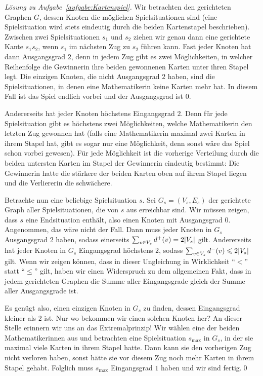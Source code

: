\begin{proof}[Lösung zu Aufgabe~\ref{aufgabe:Kartenspiel}]
	Wir betrachten den gerichteten Graphen $G$, dessen Knoten die möglichen Spielsituationen sind (eine Spielsituation wird stets eindeutig durch die beiden Kartenstapel beschrieben). Zwischen zwei Spielsituationen $s_1$ und $s_2$ ziehen wir genau dann eine gerichtete Kante $s_1s_2$, wenn $s_1$ im nächsten Zug zu $s_2$ führen kann. Fast jeder Knoten hat dann Ausgangsgrad $2$, denn in jedem Zug gibt es zwei Möglichkeiten, in welcher Reihenfolge die Gewinnerin ihre beiden gewonnenen Karten unter ihren Stapel legt. Die einzigen Knoten, die nicht Ausgangsgrad $2$ haben, sind die Spielsituationen, in denen eine Mathematikerin keine Karten mehr hat. In diesem Fall ist das Spiel endlich vorbei und der Ausgangsgrad ist $0$.
	
	Andererseits hat jeder Knoten höchstens Eingangsgrad $2$. Denn für jede Spielsituation gibt es höchstens zwei Möglichkeiten, welche Mathematikerin den letzten Zug gewonnen hat (falls eine Mathematikerin maximal zwei Karten in ihrem Stapel hat, gibt es sogar nur eine Möglichkeit, denn sonst wäre das Spiel schon vorbei gewesen). Für jede Möglichkeit ist die vorherige Verteilung durch die beiden untersten Karten im Stapel der Gewinnerin eindeutig bestimmt: Die Gewinnerin hatte die stärkere der beiden Karten oben auf ihrem Stapel liegen und die Verliererin die schwächere.
	
	Betrachte nun eine beliebige Spielsituation $s$. Sei $G_s=(V_s,E_s)$ der gerichtete Graph aller Spielsituationen, die von $s$ aus erreichbar sind. Wir müssen zeigen, dass $s$ eine Endsituation enthält, also einen Knoten mit Ausgangsgrad $0$. Angenommen, das wäre nicht der Fall. Dann muss jeder Knoten in $G_s$ Ausgangsgrad $2$ haben, sodass einerseits $\sum_{v\in V_s}d^+(v)=2\lvert V_s\rvert$ gilt. Andererseits hat jeder Knoten in $G_s$ Eingangsgrad höchstens $2$, sodass $\sum_{v\in V_s}d^-(v)\leqslant 2\lvert V_s\rvert$ gilt. Wenn wir zeigen können, dass in dieser Ungleichung in Wirklichkeit \enquote{$<$} statt \enquote{$\leqslant$} gilt, haben wir einen Widerspruch zu dem allgemeinen Fakt, dass in jedem gerichteten Graphen die Summe aller Eingangsgrade gleich der Summe aller Ausgangsgrade ist.
	
	Es genügt also, einen einzigen Knoten in $G_s$ zu finden, dessen Eingangsgrad kleiner als $2$ ist. Nur wo bekommen wir einen solchen Knoten her? An dieser Stelle erinnern wir uns an das Extremalprinzip! Wir wählen eine der beiden Mathematikerinnen aus und betrachten eine Spielsituation $s_\mathrm{max}$ in $G_s$, in der sie maximal viele Karten in ihrem Stapel hatte. Dann kann sie den vorherigen Zug nicht verloren haben, sonst hätte sie vor diesem Zug noch mehr Karten in ihrem Stapel gehabt. Folglich muss $s_\mathrm{max}$ Eingangsgrad $1$ haben und wir sind fertig.\qed
	

\end{proof}
